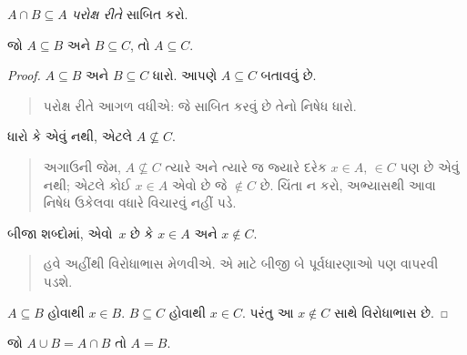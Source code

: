 \documentclass[../../../include/open-logic-section]{subfiles}
\begin{document}
\begin{prob}
$A \cap B \subseteq A$ \emph{પરોક્ષ રીતે} સાબિત કરો.
\end{prob}

\begin{prop}
જો $A \subseteq B$ અને $B \subseteq C$, તો $A \subseteq C$.
\end{prop}

\begin{proof}
  $A \subseteq B$ અને $B \subseteq C$ ધારો. આપણે $A
  \subseteq C$ બતાવવું છે.
  \begin{quote}
    પરોક્ષ રીતે આગળ વધીએ: જે સાબિત કરવું છે તેનો નિષેધ ધારો.
  \end{quote}
  ધારો કે એવું નથી, એટલે $A \nsubseteq C$.
  \begin{quote}
    અગાઉની જેમ, $A \nsubseteq C$ ત્યારે અને ત્યારે જ જ્યારે
    દરેક $x \in A$, $\in C$ પણ છે એવું નથી; એટલે કોઈ
    $x \in A$ એવો છે જે $\notin C$ છે. ચિંતા ન કરો,
    અભ્યાસથી આવા નિષેધ ઉકેલવા વધારે વિચારવું નહીં પડે.
  \end{quote}
  બીજા શબ્દોમાં, એવો~$x$ છે કે $x \in A$ અને $x \notin C$.
  \begin{quote}
    હવે અહીંથી વિરોધાભાસ મેળવીએ. એ માટે બીજી બે પૂર્વધારણાઓ
    પણ વાપરવી પડશે.
  \end{quote}
  $A \subseteq B$ હોવાથી $x \in B$. $B \subseteq C$ હોવાથી
  $x \in
  C$. પરંતુ આ $x \notin C$ સાથે વિરોધાભાસ છે.
\end{proof}

\begin{prop}
જો $A \cup B = A \cap B$ તો $A = B$.
\end{prop}
\end{document}

